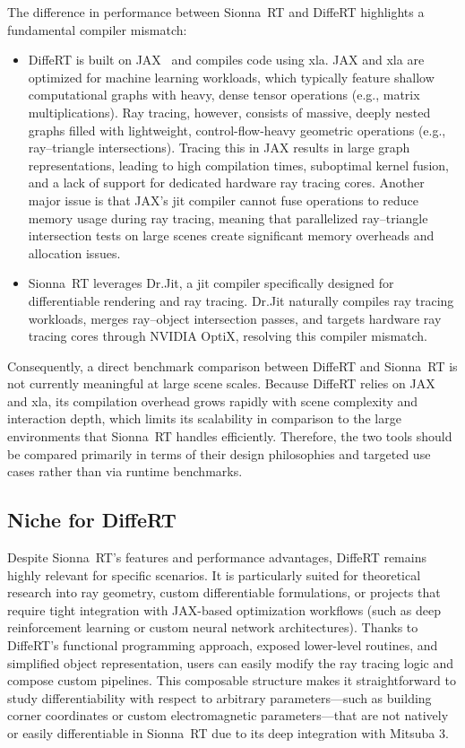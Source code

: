 The difference in performance between Sionna~RT and DiffeRT highlights a fundamental compiler mismatch:
\begin{itemize}
  \item DiffeRT is built on JAX~ and compiles code using \gls{xla}. JAX and \gls{xla} are optimized for machine learning workloads, which typically feature shallow computational graphs with heavy, dense tensor operations (e.g., matrix multiplications). Ray tracing, however, consists of massive, deeply nested graphs filled with lightweight, control-flow-heavy geometric operations (e.g., ray--triangle intersections). Tracing this in JAX results in large graph representations, leading to high compilation times, suboptimal kernel fusion, and a lack of support for dedicated hardware ray tracing cores. Another major issue is that JAX's \gls{jit} compiler cannot fuse operations to reduce memory usage during ray tracing, meaning that parallelized ray--triangle intersection tests on large scenes create significant memory overheads and allocation issues.
  \item Sionna~RT leverages Dr.Jit, a \gls{jit} compiler specifically designed for differentiable rendering and ray tracing. Dr.Jit naturally compiles ray tracing workloads, merges ray--object intersection passes, and targets hardware ray tracing cores through NVIDIA OptiX, resolving this compiler mismatch.
\end{itemize}

Consequently, a direct benchmark comparison between DiffeRT and Sionna~RT is not currently meaningful at large scene scales. Because DiffeRT relies on JAX and \gls{xla}, its compilation overhead grows rapidly with scene complexity and interaction depth, which limits its scalability in comparison to the large environments that Sionna~RT handles efficiently. Therefore, the two tools should be compared primarily in terms of their design philosophies and targeted use cases rather than via runtime benchmarks.

\subsection{Niche for DiffeRT}

Despite Sionna~RT's features and performance advantages, DiffeRT remains highly relevant for specific scenarios. It is particularly suited for theoretical research into ray geometry, custom differentiable formulations, or projects that require tight integration with JAX-based optimization workflows (such as deep reinforcement learning or custom neural network architectures). Thanks to DiffeRT's functional programming approach, exposed lower-level routines, and simplified object representation, users can easily modify the ray tracing logic and compose custom pipelines. This composable structure makes it straightforward to study differentiability with respect to arbitrary parameters---such as building corner coordinates or custom electromagnetic parameters---that are not natively or easily differentiable in Sionna~RT due to its deep integration with Mitsuba 3.

